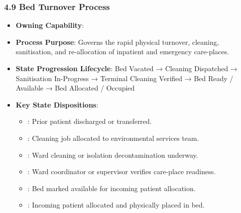 \par\smallskip
{}\label{rad:processes:203}
\subsubsection*{4.9 Bed Turnover Process}
\label{rad:processes:204}

\begin{itemize}

\item 
\textbf{Owning Capability}: \texttt{}



\item 
\textbf{Process Purpose}: Governs the rapid physical turnover, cleaning, sanitisation, and re-allocation of inpatient and emergency care-places.



\item 
\textbf{State Progression Lifecycle}: Bed Vacated → Cleaning Dispatched → Sanitisation In-Progress → Terminal Cleaning Verified → Bed Ready /\allowbreak{} Available → Bed Allocated /\allowbreak{} Occupied



\item 
\textbf{Key State Dispositions}:


\begin{itemize}

\item 
\texttt{}: Prior patient discharged or transferred.



\item 
\texttt{}: Cleaning job allocated to environmental services team.



\item 
\texttt{}: Ward cleaning or isolation decontamination underway.



\item 
\texttt{}: Ward coordinator or supervisor verifies care-place readiness.



\item 
\texttt{}: Bed marked available for incoming patient allocation.



\item 
\texttt{}: Incoming patient allocated and physically placed in bed.



\end{itemize}


\end{itemize}
\label{rad:processes:216}

